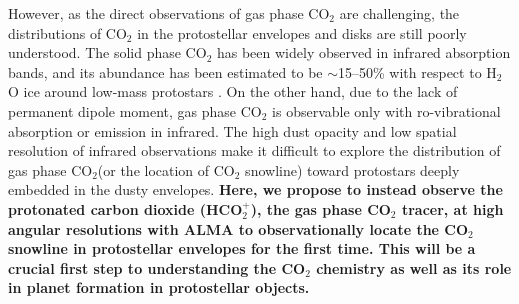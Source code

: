 \documentclass[12pt,a4paper]{article}  %
\newcommand{\carbondioxide}{CO$_2$\xspace}
\newcommand{\protonatedcarbondioxide}{HCO$_2^+$\xspace}
\newcommand{\water}{H$_2$O\xspace}
\begin{document}
However, as the direct observations of gas phase \carbondioxide are challenging, the distributions of \carbondioxide in the protostellar envelopes and disks are still poorly understood. The solid phase \carbondioxide has been widely observed in infrared absorption bands, and its abundance has been estimated to be $\sim$15--50\% with respect to \water ice around low-mass protostars \citep{Oberg11}. On the other hand, due to the lack of permanent dipole moment, gas phase \carbondioxide is observable only with ro-vibrational absorption or emission in infrared. The high dust opacity and low spatial resolution of infrared observations make it difficult to explore the distribution of gas phase \carbondioxide (or the location of \carbondioxide snowline) toward protostars deeply embedded in the dusty envelopes. \textbf{Here, we propose to instead observe the protonated carbon dioxide (\protonatedcarbondioxide), the gas phase \carbondioxide tracer, at high angular resolutions with ALMA to observationally locate the \carbondioxide snowline in protostellar envelopes for the first time. This will be a crucial first step to understanding the \carbondioxide chemistry as well as its role in planet formation in protostellar objects.}
\end{document}

